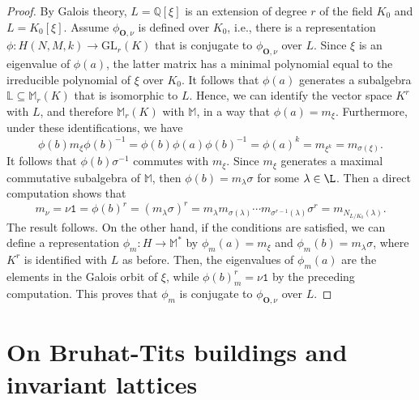 \documentclass{article}
\theoremstyle{definition}
\begin{document}
\begin{proof}
    By Galois theory, $L=\mathbb{Q}[\xi]$ is an extension of degree $r$ of
    the field $K_0$ and $L=K_0[\xi]$. Assume $\phi_{\mathbf{O},\nu}$
    is defined over $K_0$, i.e., there is a representation 
    $\phi:H(N,M,k)\rightarrow \mathrm{GL}_r(K)$ that is conjugate to
    $\phi_{\mathbf{O},\nu}$ over $L$. 
    Since $\xi$ is an eigenvalue of $\phi(a)$,
    the latter matrix has a minimal polynomial
    equal to the irreducible polynomial
    of $\xi$ over $K_0$. It follows that 
    $\phi(a)$ generates a subalgebra 
    $\mathbb{L}\subseteq\mathbb{M}_r(K)$
    that is isomorphic to $L$. Hence,
    we can identify the vector space $K^r$ with $L$, and therefore
    $\mathbb{M}_r(K)$ with $\mathbb{M}$, in
    a way that $\phi(a)=m_\xi$. Furthermore, under these identifications,
    we have $$\phi(b)m_\xi\phi(b)^{-1}=
    \phi(b)\phi(a)\phi(b)^{-1}=\phi(a)^k=m_{\xi^k}=m_{\sigma(\xi)}.$$
    It follows that $\phi(b)\sigma^{-1}$ commutes
    with $m_{\xi}$. Since $m_{\xi}$ generates a maximal 
    commutative subalgebra of 
    $\mathbb{M}$, then $\phi(b)=m_\lambda\sigma$
    for some $\lambda\in\L$. Then a direct computation shows that 
    $$m_\nu=\nu\mathtt{1}=\phi(b)^r=
    (m_\lambda\sigma)^r=
    m_\lambda m_{\sigma(\lambda)}\cdots
    m_{\sigma^{r-1}(\lambda)}\sigma^r=
    m_{N_{L/K_0}(\lambda)}.$$
    The result follows.
    On the other hand, if the conditions are
    satisfied, we can define a representation 
    $\phi_m:H\rightarrow\mathbb{M}^*$ by $\phi_m(a)=m_\xi$ and 
    $\phi_m(b)=m_\lambda\sigma$, where $K^r$
    is identified with $L$ as before.
    Then, the eigenvalues of $\phi_m(a)$
    are the elements in the Galois orbit
    of $\xi$, while $\phi(b)_m^r=\nu\mathtt{1}$
    by the preceding computation.
    This proves that $\phi_m$ is conjugate to
    $\phi_{\mathbf{O},\nu}$ over $L$.
\end{proof}

\section{On Bruhat-Tits buildings and invariant lattices}
\end{document}
